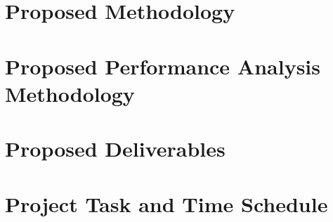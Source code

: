 \documentclass[12pt, a4paper, oneside]{article}
\begin{document}
\break
\section{Proposed Methodology}

\break
\section{Proposed Performance Analysis Methodology}

\break
\section{Proposed Deliverables}

\break
\section{Project Task and Time Schedule}

\break


\end{document}
